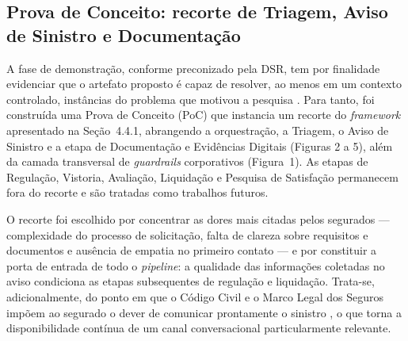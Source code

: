 %
%

\subsection{Prova de Conceito: recorte de Triagem, Aviso de Sinistro e Documentação}
\label{sec:poc}

A fase de demonstração, conforme preconizado pela DSR, tem por finalidade evidenciar que o
artefato proposto é capaz de resolver, ao menos em um contexto controlado, instâncias do
problema que motivou a pesquisa \cite{peffers2007,hevner2004}. Para tanto, foi construída uma
Prova de Conceito (PoC) que instancia um recorte do \textit{framework} apresentado na
Seção~4.4.1, abrangendo a orquestração, a Triagem, o Aviso de Sinistro e a etapa de
Documentação e Evidências Digitais (Figuras 2 a 5), além da camada transversal de
\textit{guardrails} corporativos (Figura~1). As etapas de Regulação, Vistoria, Avaliação,
Liquidação e Pesquisa de Satisfação permanecem fora do recorte e são tratadas como trabalhos
futuros.

O recorte foi escolhido por concentrar as dores mais citadas pelos segurados — complexidade
do processo de solicitação, falta de clareza sobre requisitos e documentos e ausência de
empatia no primeiro contato \cite{capgemini2024b} — e por constituir a porta de entrada de todo
o \textit{pipeline}: a qualidade das informações coletadas no aviso condiciona as etapas
subsequentes de regulação e liquidação. Trata-se, adicionalmente, do ponto em que o Código
Civil e o Marco Legal dos Seguros impõem ao segurado o dever de comunicar prontamente o
sinistro \cite{brasil2002codigocivil,brasil2024marco}, o que torna a disponibilidade contínua
de um canal conversacional particularmente relevante.


